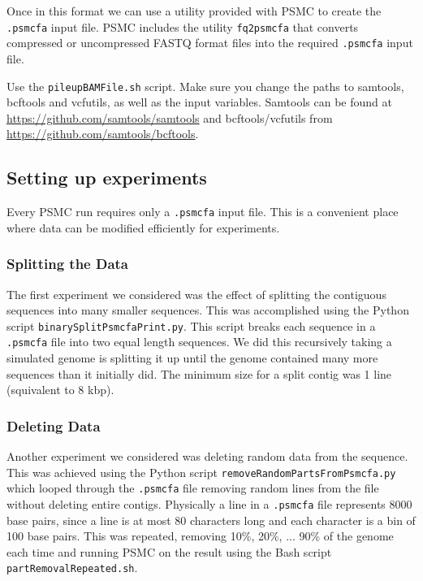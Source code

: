 \documentclass[11pt,a4paper]{article}
\begin{document}
Once in this format we can use a utility provided with PSMC to create the \verb|.psmcfa| input file. PSMC includes the utility \verb|fq2psmcfa| that converts compressed or uncompressed FASTQ format files into the required \verb|.psmcfa| input file.

Use the \verb|pileupBAMFile.sh| script. Make sure you change the paths to samtools, bcftools and vcfutils, as well as the input variables. Samtools can be found at \url{https://github.com/samtools/samtools} and bcftools/vcfutils from \url{https://github.com/samtools/bcftools}.

\subsection{Setting up experiments} %
Every PSMC run requires only a \verb|.psmcfa| input file. This is a convenient place where data can be modified efficiently for experiments.

\subsubsection{Splitting the Data}
The first experiment we considered was the effect of splitting the contiguous sequences into many smaller sequences. This was accomplished using the Python script \verb|binarySplitPsmcfaPrint.py|. This script breaks each sequence in a \verb|.psmcfa| file into two equal length sequences. We did this recursively taking a simulated genome is splitting it up until the genome contained many more sequences than it initially did. The minimum size for a split contig was 1 line (squivalent to 8 kbp).


\subsubsection{Deleting Data}
Another experiment we considered was deleting random data from the sequence. This was achieved using the Python script \verb|removeRandomPartsFromPsmcfa.py| which looped through the \verb|.psmcfa| file removing random lines from the file without deleting entire contigs. Physically a line in a \verb|.psmcfa| file represents 8000 base pairs, since a line is at most 80 characters long and each character is a bin of 100 base pairs. This was repeated, removing 10\%, 20\%, ... 90\% of the genome each time and running PSMC on the result using the Bash script \verb|partRemovalRepeated.sh|.
\end{document}
